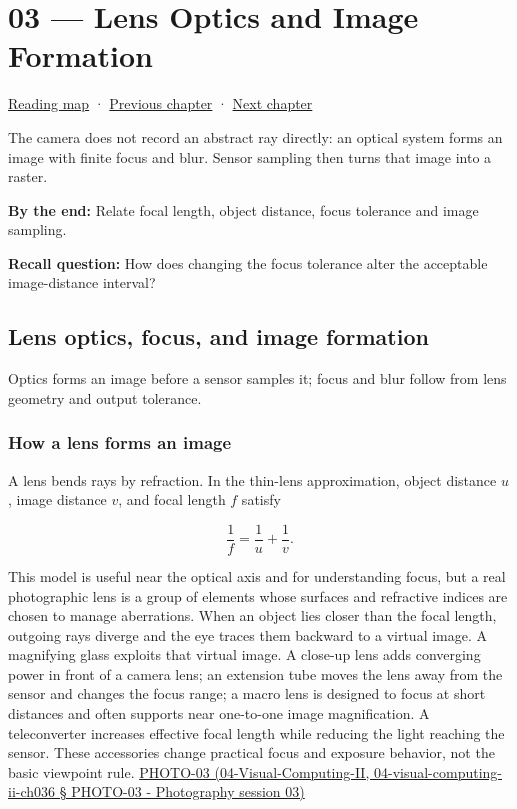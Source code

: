 \hypertarget{03-visual-computing-i-ch003}{}
\section{03 --- Lens Optics and Image Formation}\label{lens-optics-and-image-formation}

\href{Chapter\%20Edition/02\%20-\%20Graphics\%20Vision\%20and\%20XR/00\%20-\%20Reading\%20Map}{Reading map} · \hyperref[03-visual-computing-i-ch002]{Previous chapter} · \hyperref[03-visual-computing-i-ch004]{Next chapter}

The camera does not record an abstract ray directly: an optical system forms an image with finite focus and blur. Sensor sampling then turns that image into a raster.

\textbf{By the end:} Relate focal length, object distance, focus tolerance and image sampling.

\textbf{Recall question:} How does changing the focus tolerance alter the acceptable image-distance interval?

\subsection{Lens optics, focus, and image formation}\label{lens-optics-focus-and-image-formation}

Optics forms an image before a sensor samples it; focus and blur follow from lens geometry and output tolerance.

\subsubsection{How a lens forms an image}\label{how-a-lens-forms-an-image}

A lens bends rays by refraction. In the thin-lens approximation, object distance \(u\), image distance \(v\), and focal length \(f\) satisfy

\[
\frac{1}{f}=\frac{1}{u}+\frac{1}{v}.
\]

This model is useful near the optical axis and for understanding focus, but a real photographic lens is a group of elements whose surfaces and refractive indices are chosen to manage aberrations. When an object lies closer than the focal length, outgoing rays diverge and the eye traces them backward to a virtual image. A magnifying glass exploits that virtual image. A close-up lens adds converging power in front of a camera lens; an extension tube moves the lens away from the sensor and changes the focus range; a macro lens is designed to focus at short distances and often supports near one-to-one image magnification. A teleconverter increases effective focal length while reducing the light reaching the sensor. These accessories change practical focus and exposure behavior, not the basic viewpoint rule. \href{}{PHOTO-03 (04-Visual-Computing-II, 04-visual-computing-ii-ch036 § PHOTO-03 - Photography session 03)}


